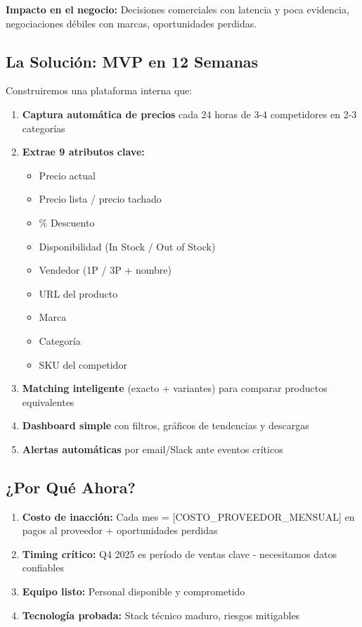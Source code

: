 \documentclass[12pt,a4paper]{article}
\begin{document}
\textbf{Impacto en el negocio:} Decisiones comerciales con latencia y poca evidencia, negociaciones débiles con marcas, oportunidades perdidas.

\subsection{La Solución: MVP en 12 Semanas}

Construiremos una plataforma interna que:

\begin{enumerate}[leftmargin=*]
    \item \textbf{Captura automática de precios} cada 24 horas de 3-4 competidores en 2-3 categorías
    \item \textbf{Extrae 9 atributos clave:}
    \begin{itemize}
        \item Precio actual
        \item Precio lista / precio tachado
        \item \% Descuento
        \item Disponibilidad (In Stock / Out of Stock)
        \item Vendedor (1P / 3P + nombre)
        \item URL del producto
        \item Marca
        \item Categoría
        \item SKU del competidor
    \end{itemize}
    \item \textbf{Matching inteligente} (exacto + variantes) para comparar productos equivalentes
    \item \textbf{Dashboard simple} con filtros, gráficos de tendencias y descargas
    \item \textbf{Alertas automáticas} por email/Slack ante eventos críticos
\end{enumerate}

\subsection{¿Por Qué Ahora?}

\begin{enumerate}[leftmargin=*]
    \item \textbf{Costo de inacción:} Cada mes = [COSTO\_PROVEEDOR\_MENSUAL] en pagos al proveedor + oportunidades perdidas
    \item \textbf{Timing crítico:} Q4 2025 es período de ventas clave - necesitamos datos confiables
    \item \textbf{Equipo listo:} Personal disponible y comprometido
    \item \textbf{Tecnología probada:} Stack técnico maduro, riesgos mitigables
\end{enumerate}
\end{document}
